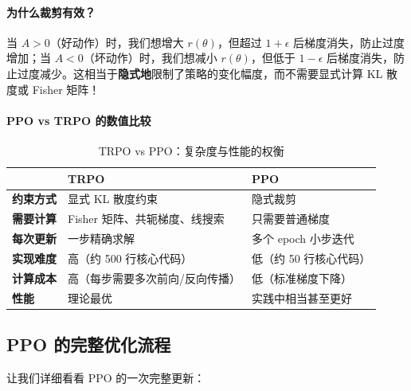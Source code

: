 \paragraph{为什么裁剪有效？}

当 $A > 0$（好动作）时，我们想增大 $r(\theta)$，但超过 $1+\epsilon$ 后梯度消失，防止过度增加；当 $A < 0$（坏动作）时，我们想减小 $r(\theta)$，但低于 $1-\epsilon$ 后梯度消失，防止过度减少。这相当于\textbf{隐式地}限制了策略的变化幅度，而不需要显式计算 KL 散度或 Fisher 矩阵！

\paragraph{PPO vs TRPO 的数值比较}\mbox{}\par\nopagebreak

\begin{table}[H]
\centering
\renewcommand{\arraystretch}{1.4}
\small
\begin{tabularx}{\textwidth}{p{2.2cm}|X|X}
\toprule
& \textbf{TRPO} & \textbf{PPO} \\
\midrule
\textbf{约束方式} & 显式 KL 散度约束 & 隐式裁剪 \\
\midrule
\textbf{需要计算} & Fisher 矩阵、共轭梯度、线搜索 & 只需要普通梯度 \\
\midrule
\textbf{每次更新} & 一步精确求解 & 多个 epoch 小步迭代 \\
\midrule
\textbf{实现难度} & 高（约 500 行核心代码） & 低（约 50 行核心代码） \\
\midrule
\textbf{计算成本} & 高（每步需要多次前向/反向传播） & 低（标准梯度下降） \\
\midrule
\textbf{性能} & 理论最优 & 实践中相当甚至更好 \\
\bottomrule
\end{tabularx}
\caption{TRPO vs PPO：复杂度与性能的权衡}
\end{table}

\subsection{PPO 的完整优化流程}

让我们详细看看 PPO 的一次完整更新：

